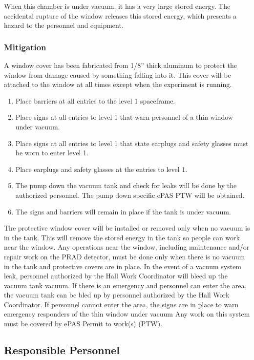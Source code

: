 When this chamber is under vacuum, it has a very large stored energy. 
The accidental rupture of the window releases this stored energy, which presents a hazard to the personnel and equipment.

\subsubsection{Mitigation}

A window cover has been fabricated from 1/8” thick aluminum to protect the window from damage caused by something falling into it. This cover will be attached to the window at all times except when the experiment is running.  
\begin{enumerate}
\item Place barriers at all entries to the level 1 spaceframe.
\item Place signs at all entries to level 1 that warn personnel of a thin window under vacuum.
\item Place signs at all entries to level 1 that state earplugs and safety glasses must be worn to enter level 1.
\item Place earplugs and safety glasses at the entries to level 1.
\item The pump down the vacuum tank and check for leaks will be done by the authorized personnel. The pump down specific ePAS PTW will be obtained.
\item The signs and barriers will remain in place if the tank is under vacuum.
\end{enumerate}

The protective window cover will be installed or removed only when no vacuum is in the tank.  This will remove the stored energy in the tank so people can work near the window.  
Any operations near the window, including maintenance and/or repair work on the PRAD detector, must be done only when there is no vacuum in the tank and protective covers are in place.
In the event of a vacuum system leak, personnel authorized by the Hall Work Coordinator will bleed up the vacuum tank vacuum.
If there is an emergency and personnel can enter the area, the vacuum tank can be bled up by personnel authorized by the Hall Work Coordinator.  If personnel cannot enter the area, the signs are in place to warn emergency responders of the thin window under vacuum
Any work on this system must be covered by ePAS Permit to work(s) (PTW).


\subsection{Responsible Personnel}

